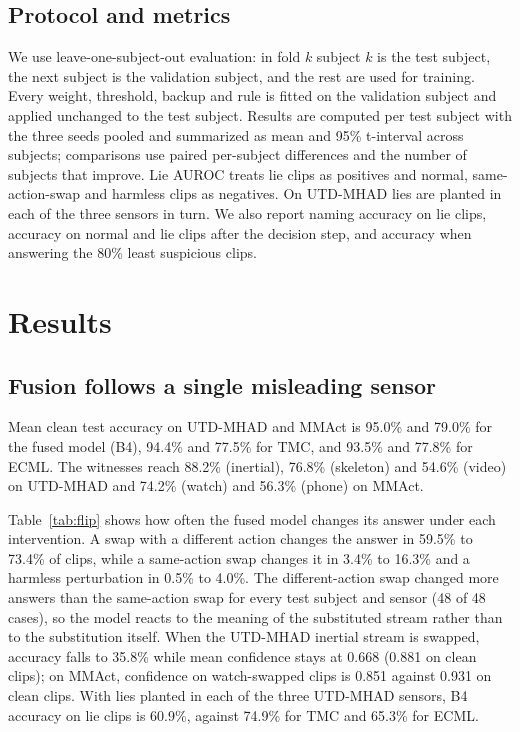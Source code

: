 \documentclass[conference]{IEEEtran}
\begin{document}
\subsection{Protocol and metrics}
We use leave-one-subject-out evaluation: in fold $k$ subject $k$ is the test subject, the next subject is the validation subject, and the rest are used for training. Every weight, threshold, backup and rule is fitted on the validation subject and applied unchanged to the test subject. Results are computed per test subject with the three seeds pooled and summarized as mean and 95\% t-interval across subjects; comparisons use paired per-subject differences and the number of subjects that improve. Lie AUROC treats lie clips as positives and normal, same-action-swap and harmless clips as negatives. On UTD-MHAD lies are planted in each of the three sensors in turn. We also report naming accuracy on lie clips, accuracy on normal and lie clips after the decision step, and accuracy when answering the 80\% least suspicious clips.

\section{Results}

\subsection{Fusion follows a single misleading sensor}

Mean clean test accuracy on UTD-MHAD and MMAct is 95.0\% and 79.0\% for the fused model (B4), 94.4\% and 77.5\% for TMC, and 93.5\% and 77.8\% for ECML. The witnesses reach 88.2\% (inertial), 76.8\% (skeleton) and 54.6\% (video) on UTD-MHAD and 74.2\% (watch) and 56.3\% (phone) on MMAct.

Table~\ref{tab:flip} shows how often the fused model changes its answer under each intervention. A swap with a different action changes the answer in 59.5\% to 73.4\% of clips, while a same-action swap changes it in 3.4\% to 16.3\% and a harmless perturbation in 0.5\% to 4.0\%. The different-action swap changed more answers than the same-action swap for every test subject and sensor (48 of 48 cases), so the model reacts to the meaning of the substituted stream rather than to the substitution itself. When the UTD-MHAD inertial stream is swapped, accuracy falls to 35.8\% while mean confidence stays at 0.668 (0.881 on clean clips); on MMAct, confidence on watch-swapped clips is 0.851 against 0.931 on clean clips. With lies planted in each of the three UTD-MHAD sensors, B4 accuracy on lie clips is 60.9\%, against 74.9\% for TMC and 65.3\% for ECML.
\end{document}
